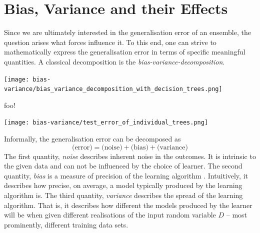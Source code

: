 \documentclass[
    a4paper, %
	fontsize=10pt, %
	twoside=false, %
]{kaobook}
\begin{document}
\section{Bias, Variance and their Effects}
 \label{sec:bias-variance-effects}

Since we are ultimately interested in the generalisation error of an ensemble, the question arises what forces influence it. To this end, one can strive to mathematically express the generalisation error in terms of specific meaningful quantities. A classical decomposition is the \textit{bias-variance-decomposition}. 


\begin{marginfigure} \label{fig:bias-variance-tradeoff}
    \texttt{[image: bias-variance/bias\_variance\_decomposition\_with\_decision\_trees.png]}
    \caption{foo!}
\end{marginfigure}


\begin{marginfigure} \label{fig:variance-trees}
    \texttt{[image: bias-variance/test\_error\_of\_individual\_trees.png]}
    \caption{
    Visualising the variance of \textcolor{blue}{Decision Tree} and \textcolor{orange}{Random Forest} models. Each glyph corresponds to the test error of one model trained on a random subset of the full available data. The variation of the test error around the mean test error across many dataset samples is exactly the variance.
    Not only do Random Forests show lower test errors on average, they seem to also have lower variance. We will explain this observation in \ref{todo}
    }
\end{marginfigure}

Informally, the generalisation error can be decomposed as
$$
\text{(error)} = \text{(noise)} + \text{(bias)} + \text{(variance)}
$$
The first quantity, \textit{noise} describes inherent noise in the outcomes. It is intrinsic to the given data and can not be influenced by the choice of learner. The second quantity, \textit{bias} is a measure of precision of the learning algorithm . Intuitively, it describes how precise, on average, a model typically produced by the learning algorithm is. The third quantity, \textit{variance} describes the spread of the learning algorithm. That is, it describes how different the models produced by the learner will be when given different realisations of the input random variable $D$ -- most prominently, different training data sets. 
\end{document}
